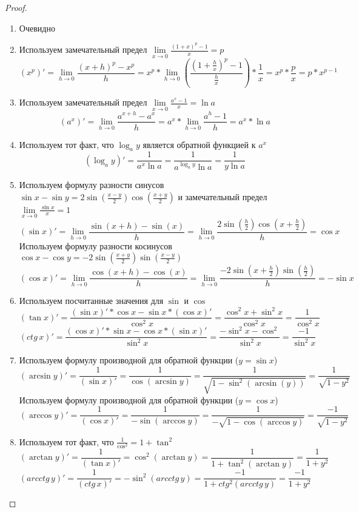 \begin{proof} \quad \\
    \begin{enumerate}
        \item Очевидно
        \item Используем замечательный предел $\lim\limits_{x \to 0} \frac{(1 + x)^p - 1}{x} = p$
        \[ (x^p)' = \lim_{h \to 0} \frac{(x + h)^p - x^p}{h} = x^p * \lim_{h \to 0} (\frac{(1 + \frac{h}{x})^p - 1}{\frac{h}{x}}) * \frac{1}{x} = x^p * \frac{p}{x} = p * x^{p - 1} \]
        \item Используем замечательный предел $\lim\limits_{x \to 0} \frac{a^x - 1}{x} = \ln a$
        \[ (a^x)' = \lim_{h \to 0} \frac{a^{x + h} - a^x}{h} = a^x * \lim_{h \to 0} \frac{a^h - 1}{h} = a^x * \ln a \]
        \item Используем тот факт, что $\log_a y$ является обратной функцией к $a^x$
        \[ (\log_a y)' = \frac{1}{a^x \ln a} = \frac{1}{a^{\log_a y}\ln a} = \frac{1}{y\ln a} \]
        \item Используем формулу разности синусов $\sin x - \sin y = 2\sin(\frac{x - y}{2})\cos(\frac{x + y}{2})$ и замечательный предел $\lim\limits_{x \to 0} \frac{\sin x}{x} = 1$
        \[ (\sin x)' = \lim_{h \to 0} \frac{\sin(x + h) - \sin(x)}{h} = \lim_{h \to 0} \frac{2\sin(\frac{h}{2})\cos(x + \frac{h}{2})}{h} = \cos x \]
        Используем формулу разности косинусов $\cos x - \cos y = -2\sin(\frac{x + y}{2})\sin(\frac{x - y}{2})$
        \[ (\cos x)' = \lim_{h \to 0} \frac{\cos(x + h) - \cos(x)}{h} = \lim_{h \to 0} \frac{-2\sin(x + \frac{h}{2})\sin(\frac{h}{2})}{h} = -\sin x \]
        \item Используем посчитанные значения для $\sin$ и $\cos$
        \[ (\tan x)' = \frac{(\sin x)' * \cos x - \sin x * (\cos x)'}{\cos^2 x} = \frac{\cos^2 x + \sin^2 x}{\cos^2 x} = \frac{1}{\cos^2 x} \]
        \[ (ctg \, x)' = \frac{(\cos x)' * \sin x - \cos x * (\sin x)'}{\sin^2 x} = \frac{-\sin^2 x - \cos^2}{\sin^2 x} = \frac{-1}{\sin^2 x} \]
        \item Используем формулу производной для обратной функции ($y = \sin x$)
        \[ (\arcsin y)' = \frac{1}{(\sin x)'} = \frac{1}{\cos(\arcsin y)} = \frac{1}{\sqrt{1 - \sin^2(\arcsin(y))}} = \frac{1}{\sqrt{1 - y^2}}\] 
        Используем формулу производной для обратной функции ($y = \cos x$)
        \[ (\arccos y)' = \frac{1}{(\cos x)'} = \frac{1}{-\sin(\arccos y)} = \frac{1}{-\sqrt{1 - \cos(\arccos y)}} = \frac{-1}{\sqrt{1 - y^2}}  \]
        \item Используем тот факт, что $\frac{1}{\cos^2} = 1 + \tan^2$
        \[ (\arctan y)' = \frac{1}{(\tan x)'} = \cos^2(\arctan y) = \frac{1}{1 + \tan^2(\arctan y)} = \frac{1}{1 + y^2} \]
        \[ (arcctg \, y)' = \frac{1}{(ctg \, x)'} = -\sin^2(arcctg \, y) = \frac{-1}{1 + ctg^2(arcctg \, y)} = \frac{-1}{1 + y^2}  \]
    \end{enumerate}
\end{proof}